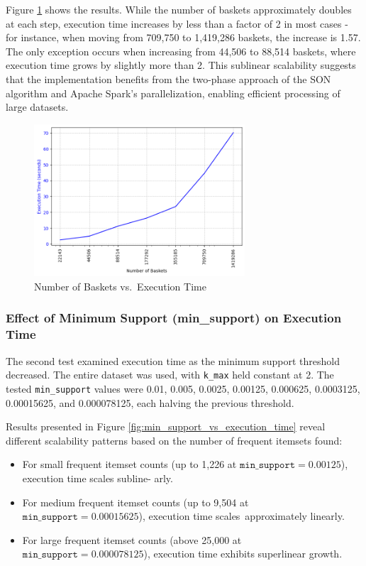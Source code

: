 \documentclass{Class/julia}
\begin{document}
Figure \ref{fig:n_baskets_vs_execution_time} shows the results. While the number of baskets approximately doubles at each step, execution time increases by less than a factor of 2 in most cases - for instance, when moving from 709,750 to 1,419,286 baskets, the increase is 1.57. The only exception occurs when increasing from 44,506 to 88,514 baskets, where execution time grows by slightly more than 2. This sublinear scalability suggests that the implementation benefits from the two-phase approach of the SON algorithm and Apache Spark’s parallelization, enabling efficient processing of large datasets.

\begin{figure}[!ht]
    \centering
    \includegraphics[width=0.7\textwidth]{n_baskets_vs_execution_time.png}
    \caption{Number of Baskets vs.\ Execution Time}
    \label{fig:n_baskets_vs_execution_time}
\end{figure}

\subsubsection{Effect of Minimum Support (min\_support) on Execution Time}

The second test examined execution time as the minimum support threshold decreased. The entire dataset was used, with \texttt{k\_max} held constant at 2. The tested \texttt{min\_support} values were 0.01, 0.005, 0.0025, 0.00125, 0.000625, 0.0003125, 0.00015625, and 0.000078125, each halving the previous threshold.  

Results presented in Figure \ref{fig:min_support_vs_execution_time} reveal different scalability patterns based on the number of frequent itemsets found:  
\begin{itemize}
    \item For small frequent itemset counts (up to 1,226 at \( \texttt{min\_support} = 0.00125 \)), execution time scales subline- arly.  
    \item For medium frequent itemset counts (up to 9,504 at \( \texttt{min\_support} = 0.00015625 \)), execution time scales~approximately linearly.  
    \item For large frequent itemset counts (above 25,000 at \( \texttt{min\_support} = 0.000078125 \)), execution time exhibits superlinear growth.  
\end{itemize}
\end{document}
